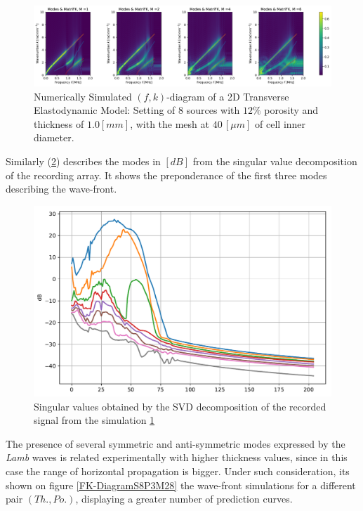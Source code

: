 \begin{figure}[!h]
	\centering
	\includegraphics[width=\textwidth]{images/TimeMultSous/2DTimeS8P12ElasticFK10M780_y.pdf}
	\caption{Numerically Simulated $(f,k)$-diagram of a 2D Transverse Elastodynamic Model: Setting of 8 sources with $12\%$ porosity and thickness of $1.0 [mm]$, with the mesh at $40 \, [\mu m]$ of cell inner diameter.}
	\label{FK-DiagramS8P12M10}
\end{figure}

Similarly (\ref{SVD-S8P12M10}) describes the modes in $[dB]$ from the singular value decomposition of the recording array. It shows the preponderance of the first three modes describing the wave-front.

\begin{figure}[!h]
	\centering
	\includegraphics[scale=.5]{images/TimeMultSous/2DTimeS8P12Elastic10_SV.pdf}
	\caption{Singular values obtained by the SVD decomposition of the recorded signal from the simulation \ref{FK-DiagramS8P12M10}}
	\label{SVD-S8P12M10}
\end{figure}

The presence of several symmetric and anti-symmetric modes expressed by the \textit{Lamb} waves is related experimentally with higher thickness values, since in this case the range of horizontal propagation is bigger.
Under such consideration, its shown on figure \ref{FK-DiagramS8P3M28} the wave-front simulations for a different pair $(Th., Po.)$, displaying a greater number of prediction curves.

